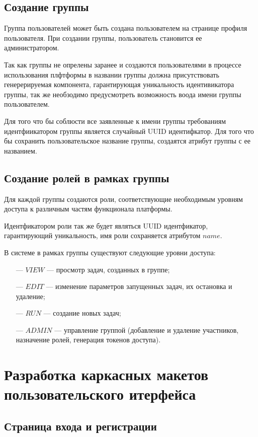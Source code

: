 \subsection{Создание группы}

Группа пользователей может быть создана пользователем на странице профиля пользователя. При создании группы, пользователь становится ее администратором.

Так как группы не опрелены заранее и создаются пользователями в процессе использования плфтформы в названии группы должна присутствовать генерерируемая компонента, гарантирующая уникальность идентивикатора группы, так же необзодимо предусмотреть возможность воода имени группы пользователем.

Для того что бы соблюсти все заявленные к имени группы требованиям идентфиикатором группы является случайный UUID идентифкатор. Для того что бы сохранить пользовательское название группы, создаятся атрибут группы с ее названием.

\subsection{Создание ролей в рамках группы}

Для каждой группы создаются роли, соответствующие необходимым уровням доступа к различным частям функционала платформы.

Идентфикатором роли так же будет являться UUID идентфикатор, гарантирующий уникальность, имя роли сохраняется атрибутом $name$.

В системе в рамках группы существуют следующие уровни доступа:

\begin{itemize}
  \item[---]$VIEW$ --– просмотр задач, созданных в группе;
  \item[---]$EDIT$ –-- изменение параметров запущенных задач, их остановка и удаление;
  \item[---]$RUN$ –-- создание новых задач;
  \item[---]$ADMIN$ –-- управление группой (добавление и удаление участников, назначение ролей, генерация токенов доступа).
\end{itemize}

\section{Разработка каркасных макетов пользовательского итерфейса}

\subsection{Страница входа и регистрации}

